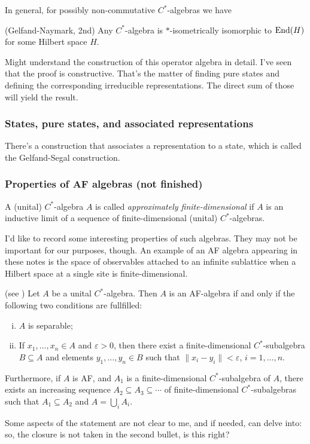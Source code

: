 In general, for possibly non-commutative $C^*$-algebras we have 
\begin{theorem}
(Gelfand-Naymark, 2nd) Any $C^*$-algebra is $*$-isometrically isomorphic to $\operatorname{End}(H)$ for some Hilbert space $H$.
\end{theorem}
\begin{fur}
Might understand the construction of this operator algebra in detail. I've seen that the proof is constructive. That's the matter of finding pure states and defining the corresponding irreducible representations. The direct sum of those will yield the result.
\end{fur}
\subsubsection{States, pure states, and associated representations}
There's a construction that associates a representation to a state, which is called the Gelfand-Segal construction.

\subsubsection{Properties of AF algebras (not finished)}
\begin{definition}
A (unital) $C^*$-algebra $A$ is called \emph{approximately finite-dimensional} if $A$ is an inductive limit of a sequence of finite-dimensional (unital) $C^*$-algebras.
\end{definition}
I'd like to record some interesting properties of such algebras. They may not be important for our purposes, though. An example of an AF algebra appearing in these notes is the space of observables attached to an infinite sublattice when a Hilbert space at a single site is finite-dimensional.
\begin{proposition} (see \cite{bratteli})
Let $A$ be a unital $C^*$-algebra. Then $A$ is an AF-algebra if and only if the following two conditions are fullfilled:
\begin{enumerate}[(i)]
\item $A$ is separable;
\item If $x_1,\ldots,x_n \in A$ and $\varepsilon > 0$, then there exist a finite-dimensional $C^*$-subalgebra $B \subseteq A$ and elements $y_1,\ldots,y_n \in B$ such that $\|x_i-y_i\| < \varepsilon$, $i=1,\ldots,n$.
\end{enumerate}
Furthermore, if $A$ is AF, and $A_1$ is a finite-dimensional $C^*$-subalgebra of $A$, there exists an increasing sequence $A_2 \subseteq A_3 \subseteq \cdots $ of finite-dimensional $C^*$-subalgebras such that $A_1 \subseteq A_2$ and $A = \bigcup_{i}A_i$.
\end{proposition}
Some aspects of the statement are not clear to me, and if needed, can delve into: so, the closure is not taken in the second bullet, is this right?

